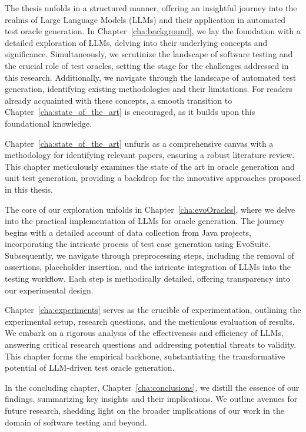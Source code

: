 The thesis unfolds in a structured manner, offering an insightful journey into the realms of Large Language Models (LLMs) and their application in automated test oracle generation. In Chapter~\ref{cha:background}, we lay the foundation with a detailed exploration of LLMs, delving into their underlying concepts and significance. Simultaneously, we scrutinize the landscape of software testing and the crucial role of test oracles, setting the stage for the challenges addressed in this research. Additionally, we navigate through the landscape of automated test generation, identifying existing methodologies and their limitations. For readers already acquainted with these concepts, a smooth transition to Chapter~\ref{cha:state_of_the_art} is encouraged, as it builds upon this foundational knowledge.

Chapter~\ref{cha:state_of_the_art} unfurls as a comprehensive canvas with a methodology for identifying relevant papers, ensuring a robust literature review. This chapter meticulously examines the state of the art in oracle generation and unit test generation, providing a backdrop for the innovative approaches proposed in this thesis.

The core of our exploration unfolds in Chapter~\ref{cha:evoOracles}, where we delve into the practical implementation of LLMs for oracle generation. The journey begins with a detailed account of data collection from Java projects, incorporating the intricate process of test case generation using EvoSuite. Subsequently, we navigate through preprocessing steps, including the removal of assertions, placeholder insertion, and the intricate integration of LLMs into the testing workflow. Each step is methodically detailed, offering transparency into our experimental design.

Chapter~\ref{cha:experiments} serves as the crucible of experimentation, outlining the experimental setup, research questions, and the meticulous evaluation of results. We embark on a rigorous analysis of the effectiveness and efficiency of LLMs, answering critical research questions and addressing potential threats to validity. This chapter forms the empirical backbone, substantiating the transformative potential of LLM-driven test oracle generation.

In the concluding chapter, Chapter~\ref{cha:conclusions}, we distill the essence of our findings, summarizing key insights and their implications. We outline avenues for future research, shedding light on the broader implications of our work in the domain of software testing and beyond.
